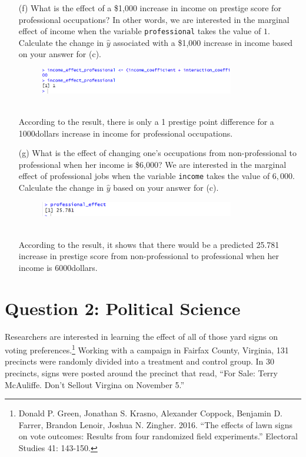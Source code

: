 \documentclass[12pt,letterpaper]{article}
\begin{document}
\begin{enumerate}
	\item [(f)]
	What is the effect of a \$1,000 increase in income on prestige score for professional occupations? In other words, we are interested in the marginal effect of income when the variable \texttt{professional} takes the value of $1$. Calculate the change in $\hat{y}$ associated with a \$1,000 increase in income based on your answer for (c).
	
		\begin{figure}[h]
		\centering
		\includegraphics[width=0.8\textwidth]{Question1_f.png}
	\end{figure}\\
		According to the result, there is only a 1 prestige point difference for a 
	    1000dollars increase in income for professional occupations.
	    
	\vspace{10cm}
	
	
	\item [(g)]
	What is the effect of changing one's occupations from non-professional to professional when her income is \$6,000? We are interested in the marginal effect of professional jobs when the variable \texttt{income} takes the value of $6,000$. Calculate the change in $\hat{y}$ based on your answer for (c).
	
	\begin{figure}[h]
		\centering
		\includegraphics[width=0.8\textwidth]{Question1_g.png}
	\end{figure}\\
	According to the result, it shows that there would be a predicted 25.781 increase in prestige score from non-professional to professional when her income is 6000dollars. 
	
\end{enumerate}
	\vspace{3cm}

\section*{Question 2: Political Science}
\vspace{.25cm}
\noindent 	Researchers are interested in learning the effect of all of those yard signs on voting preferences.\footnote{Donald P. Green, Jonathan	S. Krasno, Alexander Coppock, Benjamin D. Farrer,	Brandon Lenoir, Joshua N. Zingher. 2016. ``The effects of lawn signs on vote outcomes: Results from four randomized field experiments.'' Electoral Studies 41: 143-150. } Working with a campaign in Fairfax County, Virginia, 131 precincts were randomly divided into a treatment and control group. In 30 precincts, signs were posted around the precinct that read, ``For Sale: Terry McAuliffe. Don't Sellout Virgina on November 5.'' \\
\end{document}
